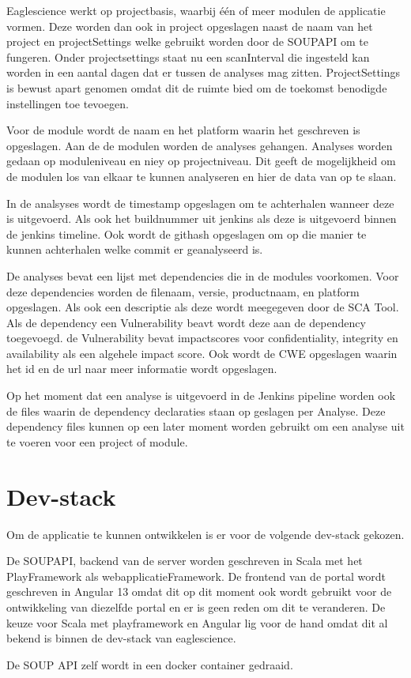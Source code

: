 Eaglescience werkt op projectbasis, waarbij één of meer modulen de applicatie vormen. Deze worden dan ook in project opgeslagen naast de naam van het project en projectSettings welke gebruikt worden door de SOUPAPI om te fungeren. Onder projectsettings staat nu een scanInterval die ingesteld kan worden in een aantal dagen dat er tussen de analyses mag zitten. ProjectSettings is bewust apart genomen omdat dit de ruimte bied om de toekomst benodigde instellingen toe tevoegen.

Voor de module wordt de naam en het platform waarin het geschreven is opgeslagen. Aan de de modulen worden de analyses gehangen. Analyses worden gedaan op moduleniveau en niey op projectniveau. Dit geeft de mogelijkheid om de modulen los van elkaar te kunnen analyseren en hier de data van op te slaan.

In de analsyses wordt de timestamp opgeslagen om te achterhalen wanneer deze is uitgevoerd. Als ook het buildnummer uit jenkins als deze is uitgevoerd binnen de jenkins timeline. Ook wordt de githash opgeslagen om op die manier te kunnen achterhalen welke commit er geanalyseerd is.

De analyses bevat een lijst met dependencies die in de modules voorkomen. Voor deze dependencies worden de filenaam, versie, productnaam, en platform opgeslagen. Als ook een descriptie als deze wordt meegegeven door de SCA Tool. Als de dependency een Vulnerability beavt wordt deze aan de dependency toegevoegd. de Vulnerability bevat impactscores voor confidentiality, integrity en availability als een algehele impact score. Ook wordt de CWE opgeslagen waarin het id en de url naar meer informatie wordt opgeslagen.

Op het moment dat een analyse is uitgevoerd in de Jenkins pipeline worden ook de files waarin de dependency declaraties staan op geslagen per Analyse. Deze dependency files kunnen op een later moment worden gebruikt om een analyse uit te voeren voor een project of module.

\section{Dev-stack}

Om de applicatie te kunnen ontwikkelen is er voor de volgende dev-stack gekozen.

De SOUPAPI, backend van de server worden geschreven in Scala met het PlayFramework als webapplicatieFramework. De frontend van de portal wordt geschreven in Angular 13 omdat dit op dit moment ook wordt gebruikt voor de ontwikkeling van diezelfde portal en er is geen reden om dit te veranderen.
De keuze voor Scala met playframework en Angular lig voor de hand omdat dit al bekend is binnen de dev-stack van eaglescience.

De SOUP API zelf wordt in een docker container gedraaid.

